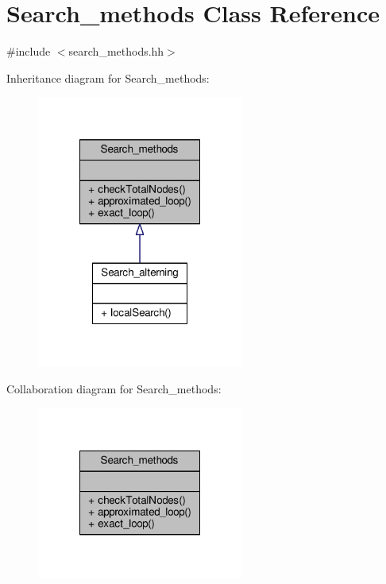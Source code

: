 \hypertarget{classSearch__methods}{\section{Search\-\_\-methods Class Reference}
\label{classSearch__methods}
}


{\ttfamily \#include $<$search\-\_\-methods.\-hh$>$}



Inheritance diagram for Search\-\_\-methods\-:
\nopagebreak
\begin{figure}[H]
\begin{center}
\leavevmode
\includegraphics[width=192pt]{classSearch__methods__inherit__graph}
\end{center}
\end{figure}


Collaboration diagram for Search\-\_\-methods\-:
\nopagebreak
\begin{figure}[H]
\begin{center}
\leavevmode
\includegraphics[width=192pt]{classSearch__methods__coll__graph}
\end{center}
\end{figure}
